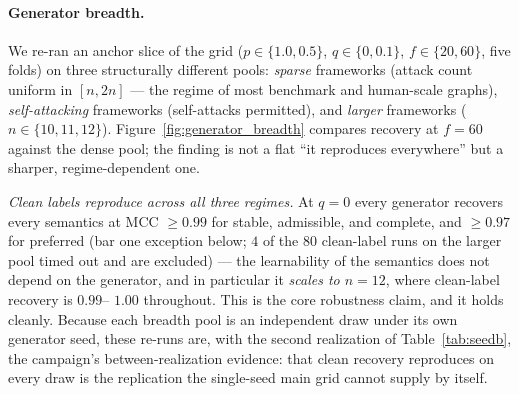 \documentclass[review,12pt]{elsarticle}
\theoremstyle{definition}
\theoremstyle{remark}
\begin{document}
\paragraph{Generator breadth.} We re-ran an anchor slice of the grid
($p\in\{1.0,0.5\}$, $q\in\{0,0.1\}$, $f\in\{20,60\}$, five folds) on three
structurally different pools: \emph{sparse} frameworks (attack count uniform in
$[n,2n]$ --- the regime of most benchmark and human-scale graphs),
\emph{self-attacking} frameworks (self-attacks permitted), and \emph{larger}
frameworks ($n\in\{10,11,12\}$). Figure~\ref{fig:generator_breadth} compares
recovery at $f=60$ against the dense pool; the finding is not a flat ``it
reproduces everywhere'' but a sharper, regime-dependent one.

\emph{Clean labels reproduce across all three regimes.} At $q=0$ every
generator recovers every semantics at MCC $\ge 0.99$ for stable, admissible,
and complete, and $\ge 0.97$ for preferred (bar one exception below; $4$ of
the $80$ clean-label runs on the larger pool timed out and are excluded) ---
the learnability of the semantics does not depend on the generator, and in
particular it \emph{scales to $n=12$}, where clean-label recovery is $0.99$--
$1.00$ throughout. This is the core robustness claim, and it holds cleanly.
Because each breadth pool is an independent draw under its own generator
seed, these re-runs are, with the second realization of Table~\ref{tab:seedb},
the campaign's between-realization evidence: that clean recovery reproduces on
every draw is the replication the single-seed main grid cannot supply by itself.
\end{document}
